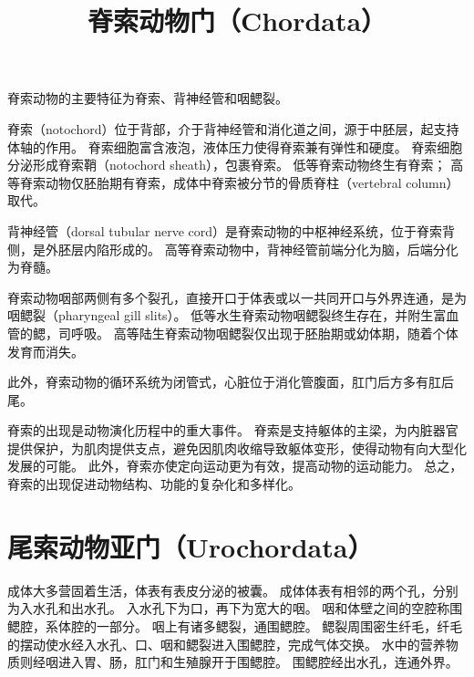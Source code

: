 \documentclass[11pt]{article}
\title{脊索动物门（Chordata）}
\date{}
\begin{document}
  \maketitle

  \linenumbers
脊索动物的主要特征为脊索、背神经管和咽鳃裂。

\newline

脊索（notochord）位于背部，介于背神经管和消化道之间，源于中胚层，起支持体轴的作用。
脊索细胞富含液泡，液体压力使得脊索兼有弹性和硬度。
脊索细胞分泌形成脊索鞘（notochord sheath），包裹脊索。
低等脊索动物终生有脊索；
高等脊索动物仅胚胎期有脊索，成体中脊索被分节的骨质脊柱（vertebral column）取代。

\newline

背神经管（dorsal tubular nerve cord）是脊索动物的中枢神经系统，位于脊索背侧，是外胚层内陷形成的。
高等脊索动物中，背神经管前端分化为脑，后端分化为脊髓。

\newline

脊索动物咽部两侧有多个裂孔，直接开口于体表或以一共同开口与外界连通，是为咽鳃裂（pharyngeal gill slits）。
低等水生脊索动物咽鳃裂终生存在，并附生富血管的鳃，司呼吸。
高等陆生脊索动物咽鳃裂仅出现于胚胎期或幼体期，随着个体发育而消失。

\newline

此外，脊索动物的循环系统为闭管式，心脏位于消化管腹面，肛门后方多有肛后尾。

\newline

脊索的出现是动物演化历程中的重大事件。
脊索是支持躯体的主梁，为内脏器官提供保护，为肌肉提供支点，避免因肌肉收缩导致躯体变形，使得动物有向大型化发展的可能。
此外，脊索亦使定向运动更为有效，提高动物的运动能力。
总之，脊索的出现促进动物结构、功能的复杂化和多样化。
  
\section{尾索动物亚门（Urochordata）}
成体大多营固着生活，体表有表皮分泌的被囊。
成体体表有相邻的两个孔，分别为入水孔和出水孔。
入水孔下为口，再下为宽大的咽。
咽和体壁之间的空腔称围鳃腔，系体腔的一部分。
咽上有诸多鳃裂，通围鳃腔。
鳃裂周围密生纤毛，纤毛的摆动使水经入水孔、口、咽和鳃裂进入围鳃腔，完成气体交换。
水中的营养物质则经咽进入胃、肠，肛门和生殖腺开于围鳃腔。
围鳃腔经出水孔，连通外界。

\newline
\end{document}
